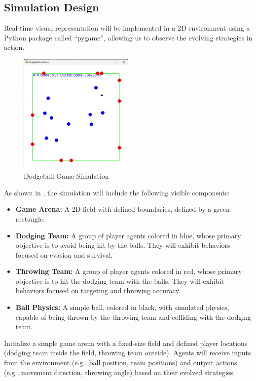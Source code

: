 \documentclass[12pt,letterpaper]{article}
\begin{document}
\subsection{Simulation Design}
Real-time visual representation will be implemented in a 2D environment using a Python package called ``pygame'', allowing us to observe the evolving strategies in action. 
\begin{figure}[H]
    \centering
    \includegraphics[width=0.5\textwidth]{images/dodgeball_demo.jpg}
    \caption{Dodgeball Game Simulation}
    \label{fig:dodgeball_demo}
\end{figure}
As shown in , the simulation will include the following visible components:
\begin{itemize}
    \item \textbf{Game Arena:} A 2D field with defined boundaries, defined by a green rectangle.
    \item \textbf{Dodging Team:} A group of player agents colored in blue, whose primary objective is to avoid being hit by the balls. They will exhibit behaviors focused on evasion and survival.
    \item \textbf{Throwing Team:} A group of player agents colored in red, whose primary objective is to hit the dodging team with the balls. They will exhibit behaviors focused on targeting and throwing accuracy.
    \item \textbf{Ball Physics:} A simple ball, colored in black, with simulated physics, capable of being thrown by the throwing team and colliding with the dodging team.
\end{itemize}
Initialize a simple game arena with a fixed-size field and defined player locations (dodging team inside the field, throwing team outside).
Agents will receive inputs from the environment (e.g., ball position, team positions) and output actions (e.g., movement direction, throwing angle) based on their evolved strategies.
\end{document}
